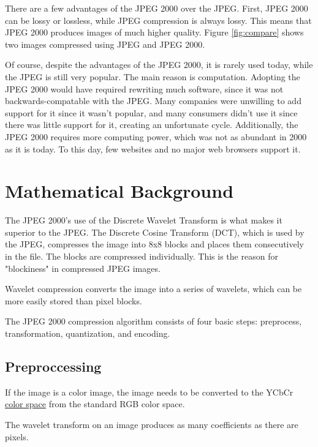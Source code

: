 \documentclass{article}
\begin{document}
There are a few advantages of the JPEG 2000 over the JPEG.
First, JPEG 2000 can be lossy or lossless, while JPEG compression is always lossy.
This means that JPEG 2000 produces images of much higher quality.
Figure \ref{fig:compare} shows two images compressed using JPEG and JPEG 2000.

Of course, despite the advantages of the JPEG 2000, it is rarely used today, 
while the JPEG is still very popular.
The main reason is computation.\cite{alternative} 
Adopting the JPEG 2000 would have required rewriting much software, 
since it was not backwards-compatable with the JPEG.
Many companies were unwilling to add support for it since it wasn't popular,
and many consumers didn't use it since there was little support for it,
creating an unfortunate cycle. 
Additionally, the JPEG 2000 requires more computing power, which was not as abundant in 2000 as it is today.
To this day, few websites and no major web browsers support it.


\section{Mathematical Background}

The JPEG 2000's use of the Discrete Wavelet Transform is what makes it superior to the JPEG.\cite{how}
The Discrete Cosine Transform (DCT), which is used by the JPEG, compresses the image into 8x8 blocks
and places them consecutively in the file.
The blocks are compressed individually.
This is the reason for "blockiness" in compressed JPEG images.

Wavelet compression converts the image into a series of wavelets, which can be more easily stored than pixel blocks.

The JPEG 2000 compression algorithm consists of four basic steps: 
preprocess, transformation, quantization, and encoding\cite{whydomath}.

\subsection{Preproccessing}

If the image is a color image, the image needs to be converted to the YCbCr \href{https://en.wikipedia.org/wiki/Color_space}{color space} 
from the standard RGB color space.

The wavelet transform on an image produces as many coefficients as there are pixels.
\end{document}
